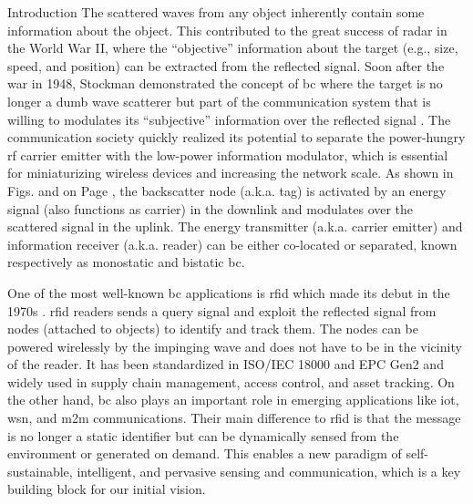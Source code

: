 \begin{section}{}
	\begin{subsection}{Introduction}
		The scattered waves from any object inherently contain some information about the object.
		This contributed to the great success of radar in the World War II, where the ``objective'' information about the target (e.g., size, speed, and position) can be extracted from the reflected signal.
		Soon after the war in 1948, Stockman demonstrated the concept of \gls{bc} where the target is no longer a dumb wave scatterer but part of the communication system that is willing to modulates its ``subjective'' information over the reflected signal \cite{Stockman1948}.
		The communication society quickly realized its potential to separate the power-hungry \gls{rf} carrier emitter with the low-power information modulator, which is essential for miniaturizing wireless devices and increasing the network scale.
		As shown in Figs.  and  on Page \pageref{fg:wipt_schemes}, the backscatter node (a.k.a. tag) is activated by an energy signal (also functions as carrier) in the downlink and modulates over the scattered signal in the uplink. The energy transmitter (a.k.a. carrier emitter) and information receiver (a.k.a. reader) can be either co-located or separated, known respectively as monostatic and bistatic \gls{bc}.

		One of the most well-known \gls{bc} applications is \gls{rfid} which made its debut in the 1970s \cite{Landt2005}.
		\gls{rfid} readers sends a query signal and exploit the reflected signal from nodes (attached to objects) to identify and track them.
		The nodes can be powered wirelessly by the impinging wave and does not have to be in the vicinity of the reader.
		It has been standardized in ISO/IEC 18000 and EPC Gen2 \cite{Abbasi2021a} and widely used in supply chain management, access control, and asset tracking.
		On the other hand, \gls{bc} also plays an important role in emerging applications like \gls{iot}, \gls{wsn}, and \gls{m2m} communications.
		Their main difference to \gls{rfid} is that the message is no longer a static identifier but can be dynamically sensed from the environment or generated on demand.
		This enables a new paradigm of self-sustainable, intelligent, and pervasive sensing and communication, which is a key building block for our initial vision.


\end{subsection}
\end{section}
